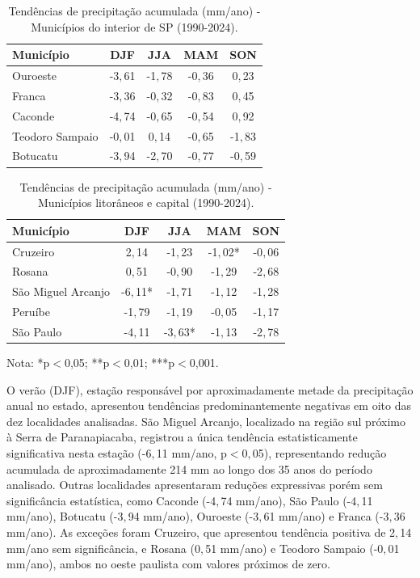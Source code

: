 \begin{table}[H]
	\centering
	\caption{Tendências de precipitação acumulada (mm/ano) - Municípios do interior de SP (1990-2024).}
	\label{tab:tendencias_prec_sp_a}
	\small
	\begin{tabular}{lcccc}
		\hline
		\textbf{Município} & \textbf{DJF} & \textbf{JJA} & \textbf{MAM} & \textbf{SON} \\
		\hline
		Ouroeste & -3${,}$61& -1${,}$78& -0${,}$36& 0${,}$23\\
		Franca& -3${,}$36& -0${,}$32& -0${,}$83& 0${,}$45\\
		Caconde  & -4${,}$74& -0${,}$65& -0${,}$54& 0${,}$92\\
		Teodoro Sampaio & -0${,}$01& 0${,}$14& -0${,}$65& -1${,}$83\\
		Botucatu   & -3${,}$94& -2${,}$70& -0${,}$77& -0${,}$59\\
		\hline
	\end{tabular}
\end{table}

\begin{table}[H]
	\centering
	\caption{Tendências de precipitação acumulada (mm/ano) - Municípios litorâneos e capital (1990-2024).}
	\label{tab:tendencias_prec_sp_b}
	\small
	\begin{tabular}{lcccc}
		\hline
		\textbf{Município} & \textbf{DJF} & \textbf{JJA} & \textbf{MAM} & \textbf{SON} \\
		\hline
		Cruzeiro& 2${,}$14& -1${,}$23& -1${,}$02*& -0${,}$06\\
		Rosana   & 0${,}$51& -0${,}$90& -1${,}$29& -2${,}$68\\
		São Miguel Arcanjo & -6${,}$11*& -1${,}$71& -1${,}$12& -1${,}$28\\
		Peruíbe   & -1${,}$79& -1${,}$19& -0${,}$05& -1${,}$17\\
		São Paulo & -4${,}$11& -3${,}$63*& -1${,}$13& -2${,}$78\\
		\hline
	\end{tabular}
	\vspace{2mm}
	
	{\footnotesize Nota: *p$<$0,05; **p$<$0,01; ***p$<$0,001.}
\end{table}

O verão (DJF), estação responsável por aproximadamente metade da precipitação anual no estado, apresentou tendências predominantemente negativas em oito das dez localidades analisadas. São Miguel Arcanjo, localizado na região sul próximo à Serra de Paranapiacaba, registrou a única tendência estatisticamente significativa nesta estação (-6${,}$11 mm/ano, p$<$0${,}$05), representando redução acumulada de aproximadamente 214 mm ao longo dos 35 anos do período analisado. Outras localidades apresentaram reduções expressivas porém sem significância estatística, como Caconde (-4${,}$74 mm/ano), São Paulo (-4${,}$11 mm/ano), Botucatu (-3${,}$94 mm/ano), Ouroeste (-3${,}$61 mm/ano) e Franca (-3${,}$36 mm/ano). As exceções foram Cruzeiro, que apresentou tendência positiva de 2${,}$14 mm/ano sem significância, e Rosana (0${,}$51 mm/ano) e Teodoro Sampaio (-0${,}$01 mm/ano), ambos no oeste paulista com valores próximos de zero.

